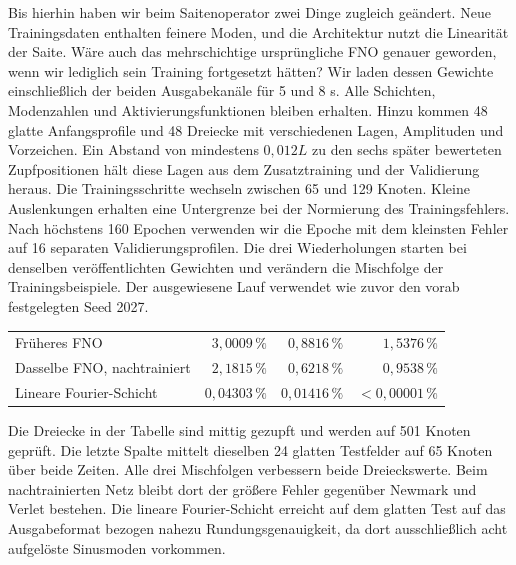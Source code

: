 Bis hierhin haben wir beim Saitenoperator zwei Dinge zugleich geändert. Neue Trainingsdaten enthalten feinere Moden, und die Architektur nutzt die Linearität der Saite. Wäre auch das mehrschichtige ursprüngliche FNO genauer geworden, wenn wir lediglich sein Training fortgesetzt hätten?
Wir laden dessen Gewichte einschließlich der beiden Ausgabekanäle für 5 und 8 s. Alle Schichten, Modenzahlen und Aktivierungsfunktionen bleiben erhalten. Hinzu kommen 48 glatte Anfangsprofile und 48 Dreiecke mit verschiedenen Lagen, Amplituden und Vorzeichen. Ein Abstand von mindestens \(0{,}012L\) zu den sechs später bewerteten Zupfpositionen hält diese Lagen aus dem Zusatztraining und der Validierung heraus. Die Trainingsschritte wechseln zwischen 65 und 129 Knoten. Kleine Auslenkungen erhalten eine Untergrenze bei der Normierung des Trainingsfehlers.
Nach höchstens 160 Epochen verwenden wir die Epoche mit dem kleinsten Fehler auf 16 separaten Validierungsprofilen. Die drei Wiederholungen starten bei denselben veröffentlichten Gewichten und verändern die Mischfolge der Trainingsbeispiele. Der ausgewiesene Lauf verwendet wie zuvor den vorab festgelegten Seed 2027.
{\tblstart\begin{tabularx}{\linewidth}{@{}Yrrr@{}}\toprule
{}&&&\\\midrule
Früheres FNO&\(3{,}0009\,\%\)&\(0{,}8816\,\%\)&\(1{,}5376\,\%\)\\
Dasselbe FNO, nachtrainiert&\(2{,}1815\,\%\)&\(0{,}6218\,\%\)&\(0{,}9538\,\%\)\\
Lineare Fourier-Schicht&\(0{,}04303\,\%\)&\(0{,}01416\,\%\)&\(<0{,}00001\,\%\)\\\bottomrule\end{tabularx}\par}
Die Dreiecke in der Tabelle sind mittig gezupft und werden auf 501 Knoten geprüft. Die letzte Spalte mittelt dieselben 24 glatten Testfelder auf 65 Knoten über beide Zeiten. Alle drei Mischfolgen verbessern beide Dreieckswerte. Beim nachtrainierten Netz bleibt dort der größere Fehler gegenüber Newmark und Verlet bestehen. Die lineare Fourier-Schicht erreicht auf dem glatten Test auf das Ausgabeformat bezogen nahezu Rundungsgenauigkeit, da dort ausschließlich acht aufgelöste Sinusmoden vorkommen.


